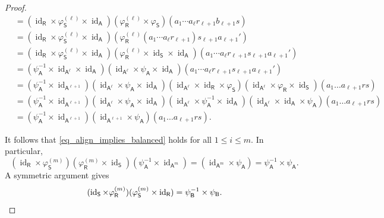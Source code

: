 \documentclass[11pt, letterpaper,final]{amsart}
\newcommand{\id}{\operatorname{id}}
\theoremstyle{definition}
\begin{document}
\begin{proof}
\begin{align*}
& = (\id_\mathsf{R} \times \varphi_\mathsf{S}^{ (\ell) } \times \id_\mathsf{A} )  ( \varphi_\mathsf{R}^{(\ell)} \times \varphi_\mathsf{S} )  ( a_1 \cdots a_\ell r_{\ell+1} b_{\ell+1}s ) \\
&= (\id_\mathsf{R} \times \varphi_\mathsf{S}^{ (\ell) } \times \id_\mathsf{A} ) (\varphi_\mathsf{R}^{(\ell)} (a_1 \cdots a_\ell r_{\ell+1}) s_{\ell+1} a_{\ell+1}')\\
&= (\id_\mathsf{R} \times \varphi_\mathsf{S}^{ (\ell) } \times \id_\mathsf{A} ) ( \varphi_\mathsf{R}^{(\ell)} \times \id_\mathsf{S} \times \id_\mathsf{A} ) (a_1 \cdots a_\ell r_{\ell+1} s_{\ell+1} a_{\ell+1}' ) \\
&= (\psi_\mathsf{A}^{-1} \times \id_{\mathsf{A}^{\ell}} \times \id_{\mathsf{A}})(\id_{\mathsf{A}^{\ell}} \times \psi_\mathsf{A} \times \id_\mathsf{A})(a_1 \cdots a_\ell r_{\ell+1} s_{\ell+1} a_{\ell+1}') \\
&= (\psi_\mathsf{A}^{-1} \times \id_{\mathsf{A}^{\ell+1}})(\id_{\mathsf{A}^{\ell}} \times \psi_\mathsf{A} \times \id_\mathsf{A}) ( \id_{\mathsf{A}^\ell} \times \id_\mathsf{R} \times \varphi_\mathsf{S}) (\id_{\mathsf{A}^\ell} \times \varphi_\mathsf{R} \times \id_\mathsf{S} ) (a_1\ldots a_{\ell+1} rs )\\
&=  (\psi_\mathsf{A}^{-1} \times \id_{\mathsf{A}^{\ell+1}})(\id_{\mathsf{A}^{\ell}} \times \psi_\mathsf{A} \times \id_\mathsf{A}) ( \id_{\mathsf{A}^\ell} \times \psi_\mathsf{A}^{-1} \times \id_\mathsf{A}) (\id_{\mathsf{A}^\ell} \times \id_\mathsf{A} \times \psi_\mathsf{A} ) (a_1\ldots a_{\ell+1} rs )\\ 
&= (\psi_\mathsf{A}^{-1} \times \id_{\mathsf{A}^{\ell+1}})(\id_{\mathsf{A}^{\ell+1}} \times \psi_\mathsf{A})(a_1\ldots a_{\ell+1} rs ).
\end{align*}

It follows that \eqref{eq_align_implies_balanced} holds for all $1 \leq i \leq m$.  In particular, 
\begin{equation*}
 (\id_\mathsf{R} \times \varphi_\mathsf{S}^{(m)}) (\varphi_\mathsf{R}^{(m)} \times\id_\mathsf{S})(\psi_\mathsf{A}^{-1} \times \id_{\mathsf{A}^m}) = (\id_{\mathsf{A}^m} \times \psi_\mathsf{A})=\psi_\mathsf{A}^{-1} \times \psi_\mathsf{A}.
\end{equation*}
A symmetric argument gives
\begin{equation*}
(\id_\mathsf{S} \times \varphi_\mathsf{R}^{(m)})(\varphi_\mathsf{S}^{(m)}\times\id_\mathsf{R})=\psi_\mathsf{B}^{-1} \times \psi_\mathsf{B}.\qedhere
\end{equation*}
\end{proof}
\end{document}
